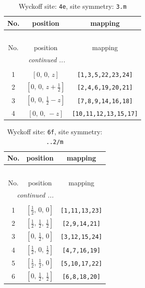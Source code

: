 \documentclass[fleqn,8pt]{jsarticle}
\begin{document}
\renewcommand{\arraystretch}{1.2}
\begin{longtable}{ccc}
\caption{Wyckoff site: {\tt 4e}, site symmetry: {\tt 3.m}}
 \\
 \hline \hline
No. & position & mapping \\ \hline \endfirsthead

\multicolumn{2}{l}{\tablename\ \thetable{}} \\
 \hline \hline
No. & position & mapping \\ \hline \endhead

 \hline \hline
\multicolumn{2}{r}{\footnotesize\it continued ...} \\ \endfoot

 \hline \hline
\multicolumn{2}{r}{} \\ \endlastfoot

1 & $\left[ 0,\, 0,\, z \right]$ & {\tt [1,3,5,22,23,24]} \\ \hline
2 & $\left[ 0,\, 0,\, z + \frac{1}{2} \right]$ & {\tt [2,4,6,19,20,21]} \\ \hline
3 & $\left[ 0,\, 0,\, \frac{1}{2} - z \right]$ & {\tt [7,8,9,14,16,18]} \\ \hline
4 & $\left[ 0,\, 0,\, - z \right]$ & {\tt [10,11,12,13,15,17]} \\
\end{longtable}
\renewcommand{\arraystretch}{1.2}
\begin{longtable}{ccc}
\caption{Wyckoff site: {\tt 6f}, site symmetry: {\tt ..2/m}}
 \\
 \hline \hline
No. & position & mapping \\ \hline \endfirsthead

\multicolumn{2}{l}{\tablename\ \thetable{}} \\
 \hline \hline
No. & position & mapping \\ \hline \endhead

 \hline \hline
\multicolumn{2}{r}{\footnotesize\it continued ...} \\ \endfoot

 \hline \hline
\multicolumn{2}{r}{} \\ \endlastfoot

1 & $\left[ \frac{1}{2},\, 0,\, 0 \right]$ & {\tt [1,11,13,23]} \\ \hline
2 & $\left[ \frac{1}{2},\, \frac{1}{2},\, \frac{1}{2} \right]$ & {\tt [2,9,14,21]} \\ \hline
3 & $\left[ 0,\, \frac{1}{2},\, 0 \right]$ & {\tt [3,12,15,24]} \\ \hline
4 & $\left[ \frac{1}{2},\, 0,\, \frac{1}{2} \right]$ & {\tt [4,7,16,19]} \\ \hline
5 & $\left[ \frac{1}{2},\, \frac{1}{2},\, 0 \right]$ & {\tt [5,10,17,22]} \\ \hline
6 & $\left[ 0,\, \frac{1}{2},\, \frac{1}{2} \right]$ & {\tt [6,8,18,20]} \\
\end{longtable}
\end{document}
